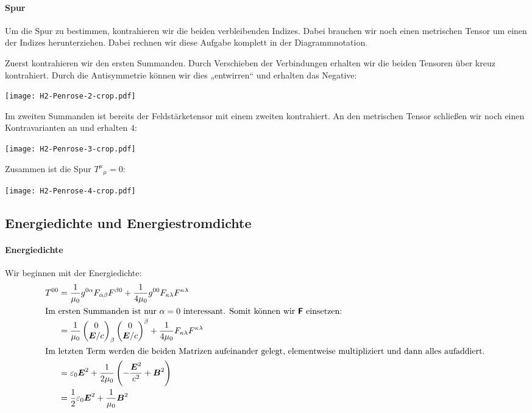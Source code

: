 \paragraph{Spur}

Um die Spur zu bestimmen, kontrahieren wir die beiden verbleibenden Indizes.
Dabei brauchen wir noch einen metrischen Tensor um einen der Indizes
herunterziehen. Dabei rechnen wir diese Aufgabe komplett in der
Diagrammnotation.

Zuerst kontrahieren wir den ersten Summanden. Durch Verschieben der
Verbindungen erhalten wir die beiden Tensoren über kreuz kontrahiert. Durch die
Antisymmetrie können wir dies „entwirren“ und erhalten das Negative:
\begin{center}
	\texttt{[image: H2-Penrose-2-crop.pdf]}
\end{center}

Im zweiten Summanden ist bereits der Feldstärketensor mit einem zweiten
kontrahiert. An den metrischen Tensor schließen wir noch einen Kontravarianten
an und erhalten $4$:
\begin{center}
	\texttt{[image: H2-Penrose-3-crop.pdf]}
\end{center}

Zusammen ist die Spur $T^\mu{}_\mu = 0$:
\begin{center}
	\texttt{[image: H2-Penrose-4-crop.pdf]}
\end{center}

\subsection{Energiedichte und Energiestromdichte}

\paragraph{Energiedichte}

Wir beginnen mit der Energiedichte:
\begin{align*}
	T^{00}
	&= \frac1{\mu_0} g^{0\alpha} F_{\alpha\beta} F^{\beta0} + \frac1{4\mu_0} g^{00} F_{\kappa\lambda} F^{\kappa\lambda} \\
	\intertext{%
		Im ersten Summanden ist nur $\alpha = 0$ interessant. Somit können wir
		$\tens F$ einsetzen:
	}
	&= \frac1{\mu_0}
	\begin{pmatrix}
		0 \\ \vec E / c
	\end{pmatrix}
	_\beta
	\begin{pmatrix}
		0 \\ \vec E / c
	\end{pmatrix}
	^\beta
	+ \frac1{4\mu_0} F_{\kappa\lambda} F^{\kappa\lambda} \\
	\intertext{%
		Im letzten Term werden die beiden Matrizen aufeinander gelegt,
		elementweise multipliziert und dann alles aufaddiert.
	}
	&= \varepsilon_0 \vec E^2 + \frac1{2\mu_0} \del{- \frac{\vec E^2}{c^2} + \vec B^2} \\
	&= \half \varepsilon_0 \vec E^2 + \frac1{\mu_0} \vec B^2
\end{align*}

